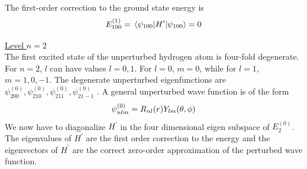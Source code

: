 	The first-order correction to the ground state energy is
	\begin{equation*}
		E_{100}^{(1)} = \expval{H^\prime}{\psi_{100}} = 0
	\end{equation*}
	
	\underline{Level $n=2$}\\
	The first excited state of the unperturbed hydrogen atom is four-fold degenerate. For $n=2$, $l$ can have values $l=0,1$. For $l=0$, $m=0$, while for $l=1$, $m=1,0,-1$. The degenerate unperturbed eigenfunctions are
	$\psi^{(0)}_{2 0 0},  \psi^{(0)}_{2 1 0}, \psi^{(0)}_{2 1 1}, \psi^{(0)}_{2 1 -1}$  . A general unperturbed wave function is of the form
	\begin{equation}
		\psi_{n l m}^{(0)} = R_{n l}\qty(r) Y_{l m}\qty(\theta, \phi)
	\end{equation}
	We now have to diagonalize $H^\prime$ in the four dimensional eigen subspace of $E_2^{(0)}$. The eigenvalues of $H^\prime$ are the first order correction to the energy and the eigenvectors of $H^\prime$ are the correct zero-order approximation of the perturbed wave function.\\
	
